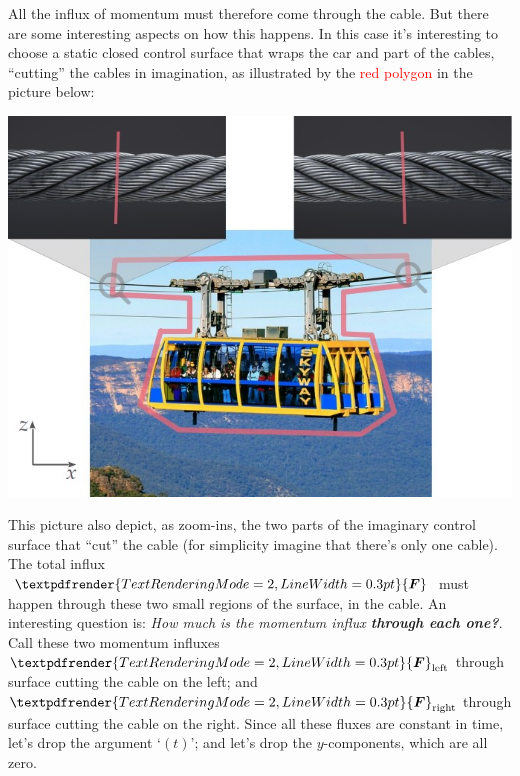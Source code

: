 \documentclass[a4paper,12pt,%
onecolumn,oneside,titlepage,%
british%
]{memoir}
\renewcommand*{\bm}[1]{\textpdfrender{TextRenderingMode=2,LineWidth=0.3pt}{\boldsymbol{#1}}}
\renewcommand*{\|}[1][]{\nonscript\:#1\vert\nonscript\:\mathopen{}}
\newcommand*{\yF}{\bm{F}}
\begin{document}
All the influx of momentum must therefore come through the cable. But there are some interesting aspects on how this happens. In this case it's interesting to choose a static closed control surface that wraps the car and part of the cables,  \enquote{cutting} the cables in imagination, as illustrated by the \textcolor{red}{red polygon} in the picture below:
\begin{center}
  \includegraphics[align=t,width=\linewidth]{images/cablecardraw.jpg}
\end{center}
This picture also depict, as zoom-ins, the two parts of the imaginary control surface that \enquote{cut} the cable (for simplicity imagine that there's only one cable). The total influx $\yF$ must happen through these two small regions of the surface, in the cable. An interesting question is: \emph{How much is the momentum influx \textbf{through each one?}}. Call these two momentum influxes $\yF_{\text{left}}$ through surface cutting the cable on the left; and $\yF_{\text{right}}$ through surface cutting the cable on the right. Since all these fluxes are constant in time, let's drop the argument \enquote*{$(t)$}; and let's drop the $y$-components, which are all zero.
\end{document}
